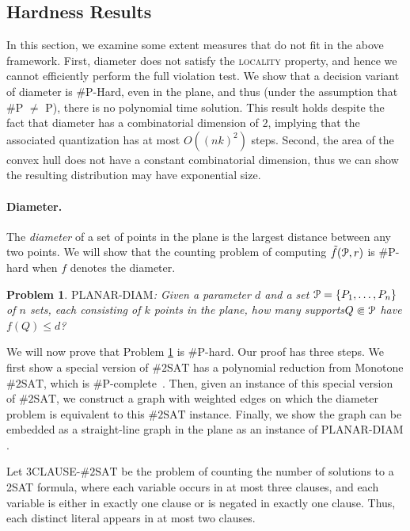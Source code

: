 \documentclass{journal}
\newcommand{\Eu}[1]{\ensuremath{\EuScript{#1}}}
\newcommand{\psets}{supports\xspace}
\newcommand{\PDIAM}{$\ensuremath{\textrm{PLANAR-DIAM}}$\xspace}
\newcommand{\twoSAT}{$\ensuremath{\textrm{\#2SAT}}$\xspace}
\newtheorem {problem}[theorem]{Problem}
\begin{document}
\subsection {Hardness Results}

In this section, we examine some extent measures that do not fit in the above framework.
First, diameter does not satisfy the \textsc{locality} property, and hence we cannot efficiently perform the full violation test.  
We show that a decision variant of diameter is \#P-Hard, even in the plane, and thus (under the assumption that \#P $\neq$ P), there is no polynomial time solution.  This result holds despite the fact that diameter has a combinatorial dimension of $2$, implying that the associated quantization has at most $O((nk)^2)$ steps.  
Second, the area of the convex hull does not have a constant combinatorial dimension, thus we can show the resulting distribution may have exponential size.  


\paragraph{Diameter.}
The \emph {diameter} of a set of points in the plane is the largest distance between any two points. We will show that the counting problem of computing $\tilde f (\Eu P, r)$ is \#P-hard when $f$ denotes the diameter.


        \begin{problem}
        \PDIAM: 
        Given a parameter $d$ and a set $\Eu{P} = \{P_1, \ldots, P_n\}$ of $n$ sets, each consisting of $k$ points in the plane, how many \psets $Q \Subset \Eu P$ have $f(Q) \leq d$?
        \label{prb:count-diam}
        \end{problem}

We will now prove that Problem \ref{prb:count-diam} is \#P-hard.
Our proof has three steps. We first show a special version of \twoSAT has a polynomial reduction from Monotone \twoSAT, which is \#P-complete~\cite{Val79}.
Then, given an instance of this special version of \twoSAT, we construct a graph with weighted edges on which the diameter problem is equivalent to this \twoSAT instance.  Finally, we show the graph can be embedded as a straight-line graph in the plane as an instance of \PDIAM.

Let 3CLAUSE-\twoSAT be the problem of counting the number of solutions to a 2SAT formula, where each variable occurs in at most three clauses, and each variable is either in exactly one clause or is negated in exactly one clause.  Thus, each distinct literal appears in at most two clauses.  
\end{document}
